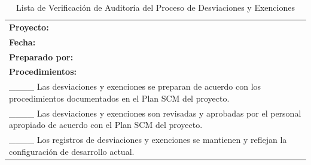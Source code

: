 \begin{table}[H]
\centering
\caption{Lista de Verificación de Auditoría del Proceso de Desviaciones y Exenciones}
\label{fig:b16}
\begin{tabular}{|p{14cm}|}
\hline
\textbf{Proyecto:} \\
\textbf{Fecha:} \\
\textbf{Preparado por:} \\
\hline
\textbf{Procedimientos:} \\
\_\_\_\_ Las desviaciones y exenciones se preparan de acuerdo con los procedimientos documentados en el Plan SCM del proyecto. \\
\_\_\_\_ Las desviaciones y exenciones son revisadas y aprobadas por el personal apropiado de acuerdo con el Plan SCM del proyecto. \\
\_\_\_\_ Los registros de desviaciones y exenciones se mantienen y reflejan la configuración de desarrollo actual. \\
\hline
\end{tabular}
\end{table}

